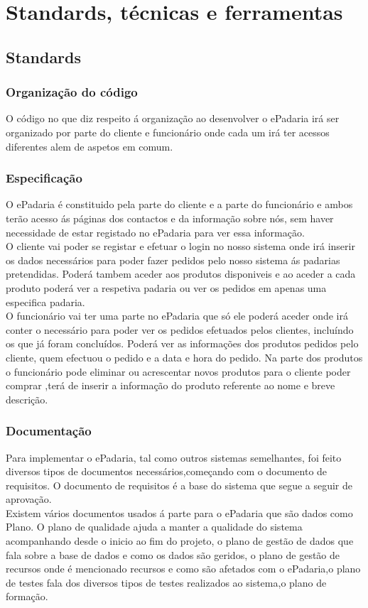 \chapter{Standards, técnicas e ferramentas}
\label{standards_tecnicas_ferramentas}

\section{Standards}
\subsection{Organização do código}
O código no que diz respeito á organização ao desenvolver o ePadaria irá ser organizado por parte do cliente e funcionário onde cada um irá ter acessos diferentes alem de aspetos em comum.
\subsection{Especificação}
O ePadaria é constituido pela parte do cliente e a parte do funcionário e ambos terão acesso ás páginas dos contactos e da informação sobre nós, sem haver necessidade de estar registado no ePadaria para ver essa informação.\\
O cliente vai poder se registar e efetuar o login no nosso sistema onde irá inserir os dados necessários para poder fazer pedidos pelo nosso sistema ás padarias pretendidas. Poderá tambem aceder aos produtos disponiveis e ao aceder a cada produto poderá ver a respetiva padaria ou ver os pedidos em apenas uma especifica padaria. \\
O funcionário vai ter uma parte no ePadaria que só ele poderá aceder onde irá conter o necessário para poder ver os pedidos efetuados pelos clientes, incluíndo os que já foram concluídos. Poderá ver as informações dos produtos pedidos pelo cliente, quem efectuou o pedido e a data e hora do pedido. Na parte dos produtos o funcionário pode eliminar ou acrescentar novos produtos para o cliente poder comprar ,terá de inserir a informação do produto referente ao nome e breve descrição.

\subsection{Documentação}
Para implementar o ePadaria, tal como outros sistemas semelhantes, foi feito diversos tipos de documentos necessários,começando com o documento de requisitos. O documento de requisitos é a base do sistema que segue a seguir de aprovação.\\
Existem vários documentos usados á parte para o ePadaria que são dados como Plano. O plano de qualidade ajuda a manter a qualidade do sistema acompanhando desde o inicio ao fim do projeto, o plano de gestão de dados que fala sobre a base de dados e como os dados são geridos, o plano de gestão de recursos onde é mencionado recursos e como são afetados com o ePadaria,o plano de testes fala dos diversos tipos de testes realizados ao sistema,o plano de formação.


